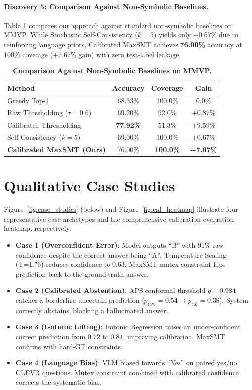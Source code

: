 \documentclass[10pt,twocolumn,letterpaper]{article}
\begin{document}
\paragraph{Discovery 5: Comparison Against Non-Symbolic Baselines.}
Table \ref{tab:baselines} compares our approach against standard non-symbolic baselines on MMVP. While Stochastic Self-Consistency ($k=5$) yields only $+0.67\%$ due to reinforcing language priors, Calibrated MaxSMT achieves \textbf{76.00\%} accuracy at $100\%$ coverage (+7.67\% gain) with zero test-label leakage.

\begin{table}[h]
\centering
\small
\caption{\textbf{Comparison Against Non-Symbolic Baselines on MMVP.}}
\label{tab:baselines}
\begin{tabular}{lccc}
\toprule
\textbf{Method} & \textbf{Accuracy} & \textbf{Coverage} & \textbf{Gain} \\
\midrule
Greedy Top-1 & 68.33\% & 100.0\% & 0.0\% \\
Raw Thresholding ($\tau=0.6$) & 69.20\% & 92.0\% & +0.87\% \\
Calibrated Thresholding & \textbf{77.92\%} & 51.3\% & +9.59\% \\
Self-Consistency ($k=5$) & 69.00\% & 100.0\% & +0.67\% \\
\textbf{Calibrated MaxSMT (Ours)} & 76.00\% & \textbf{100.0\%} & \textbf{+7.67\%} \\
\bottomrule
\end{tabular}
\end{table}

\section{Qualitative Case Studies}
Figure~\ref{fig:case_studies} (below) and Figure~\ref{fig:cal_heatmap} illustrate four representative case archetypes and the comprehensive calibration evaluation heatmap, respectively.
\begin{itemize}
    \item \textbf{Case 1 (Overconfident Error)}: Model outputs ``B'' with $91\%$ raw confidence despite the correct answer being ``A''. Temperature Scaling (T=1.76) reduces confidence to $0.63$. MaxSMT mutex constraint flips prediction back to the ground-truth answer.
    \item \textbf{Case 2 (Calibrated Abstention)}: APS conformal threshold $\hat{q}=0.984$ catches a borderline-uncertain prediction ($p_{\text{raw}}=0.54 \rightarrow p_{\text{cal}}=0.38$). System correctly abstains, blocking a hallucinated answer.
    \item \textbf{Case 3 (Isotonic Lifting)}: Isotonic Regression raises an under-confident correct prediction from $0.72$ to $0.81$, improving calibration. MaxSMT confirms with hard-GT constraints.
    \item \textbf{Case 4 (Language Bias)}: VLM biased towards ``Yes'' on paired yes/no CLEVR questions. Mutex constraint combined with calibrated confidence corrects the systematic bias.
\end{itemize}
\end{document}
